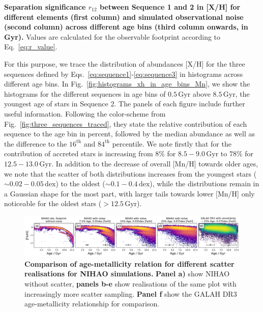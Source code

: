 \documentclass[fleqn,usenatbib]{mnras}
\begin{document}
\begin{table}
    \centering
    \caption{\textbf{Separation significance $r_{12}$ between Sequence 1 and 2 in {[X/H]} for different elements (first column) and simulated observational noise (second column) across different age bins (third column onwards, in Gyr).} Values are calculated for the observable footprint according to Eq.~\ref{eq:r_value}.}
    
    \label{tab:tabular_separation_r12_noise}
\end{table}

For this purpose, we trace the distribution of abundances [X/H] for the three sequences defined by Eqs.~\ref{eq:sequence1}-\ref{eq:sequence3} in histograms across different age bins. In Fig.~\ref{fig:histograms_xh_in_age_bins_Mn}, we show the histograms for the different sequences in age bins of $0.5\,\mathrm{Gyr}$ above $8.5\,\mathrm{Gyr}$, the youngest age of stars in Sequence 2. The panels of each figure include further useful information. Following the color-scheme from Fig.~\ref{fig:three_sequences_traced}, they state the relative contribution of each sequence to the age bin in percent, followed by the median abundance as well as the difference to the $16^\mathrm{th}$ and $84^\mathrm{th}$ percentile. We note firstly that for the contribution of accreted stars is increasing from $8\%$ for $8.5-9.0\,\mathrm{Gyr}$ to $78\%$ for $12.5-13.0\,\mathrm{Gyr}$. In addition to the decrease of overall [Mn/H] towards older ages, we note that the scatter of both distributions increases from the youngest stars ($\sim 0.02-0.05\,\mathrm{dex}$) to the oldest ($\sim 0.1-0.4\,\mathrm{dex}$), while the distributions remain in a Gaussian shape for the most part, with larger tails towards lower [Mn/H] only noticeable for the oldest stars ($> 12.5\,\mathrm{Gyr}$).

\begin{figure}
	\includegraphics[width=\textwidth]{figures/nihao_with_scatter.png}
    \caption{
    \textbf{Comparison of age-metallicity relation for different scatter realisations for NIHAO simulations.}
    \textbf{Panel a)} show NIHAO without scatter, \textbf{panels b-e} show realisations of the same plot with increasingly more scatter sampling. \textbf{Panel f} show the GALAH DR3 age-metallicity relationship for comparison.
    }
    \label{fig:nihao_with_scatter}
\end{figure}
\end{document}
